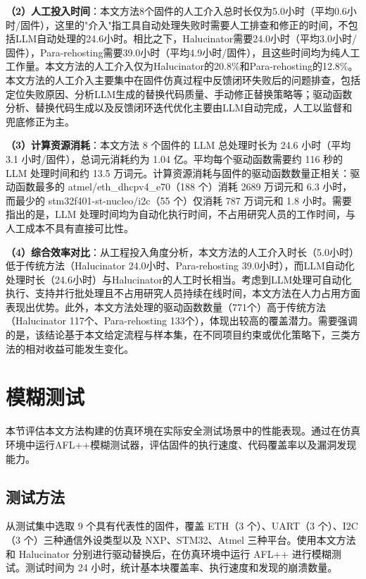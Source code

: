 \textbf{（2）人工投入时间}：本文方法8个固件的人工介入总时长仅为5.0小时（平均0.6小时/固件），这里的"介入"指工具自动处理失败时需要人工排查和修正的时间，不包括LLM自动处理的24.6小时。相比之下，Halucinator需要24.0小时（平均3.0小时/固件），Para-rehosting需要39.0小时（平均4.9小时/固件），且这些时间均为纯人工工作量。本文方法的人工介入仅为Halucinator的20.8\%和Para-rehosting的12.8\%。本文方法的人工介入主要集中在固件仿真过程中反馈闭环失败后的问题排查，包括定位失败原因、分析LLM生成的替换代码质量、手动修正替换策略等；驱动函数分析、替换代码生成以及反馈闭环迭代优化主要由LLM自动完成，人工以监督和兜底修正为主。

\textbf{（3）计算资源消耗}：本文方法 8 个固件的 LLM 总处理时长为 24.6 小时（平均 3.1 小时/固件），总词元消耗约为 1.04 亿。平均每个驱动函数需要约 116 秒的 LLM 处理时间和约 13.5 万词元。计算资源消耗与固件的驱动函数数量正相关：驱动函数最多的 atmel/eth\_dhcpv4\_e70（188 个）消耗 2689 万词元和 6.3 小时，而最少的 stm32f401-st-nucleo/i2c（55 个）仅消耗 787 万词元和 1.8 小时。需要指出的是，LLM 处理时间均为自动化执行时间，不占用研究人员的工作时间，与人工成本不具有直接可比性。

\textbf{（4）综合效率对比}：从工程投入角度分析，本文方法的人工介入时长（5.0小时）低于传统方法（Halucinator 24.0小时、Para-rehosting 39.0小时），而LLM自动化处理时长（24.6小时）与Halucinator的人工时长相当。考虑到LLM处理可自动化执行、支持并行批处理且不占用研究人员持续在线时间，本文方法在人力占用方面表现出优势。此外，本文方法处理的驱动函数数量（771个）高于传统方法（Halucinator 117个、Para-rehosting 133个），体现出较高的覆盖潜力。需要强调的是，该结论基于本文给定流程与样本集，在不同项目约束或优化策略下，三类方法的相对收益可能发生变化。

\section{模糊测试}
\label{sec:fuzz_test}

本节评估本文方法构建的仿真环境在实际安全测试场景中的性能表现。通过在仿真环境中运行AFL++模糊测试器，评估固件的执行速度、代码覆盖率以及漏洞发现能力。

\subsection{测试方法}

从测试集中选取 9 个具有代表性的固件，覆盖 ETH（3 个）、UART（3 个）、I2C（3 个）三种通信外设类型以及 NXP、STM32、Atmel 三种平台。使用本文方法和 Halucinator 分别进行驱动替换后，在仿真环境中运行 AFL++ 进行模糊测试。测试时间为 24 小时，统计基本块覆盖率、执行速度和发现的崩溃数量。

